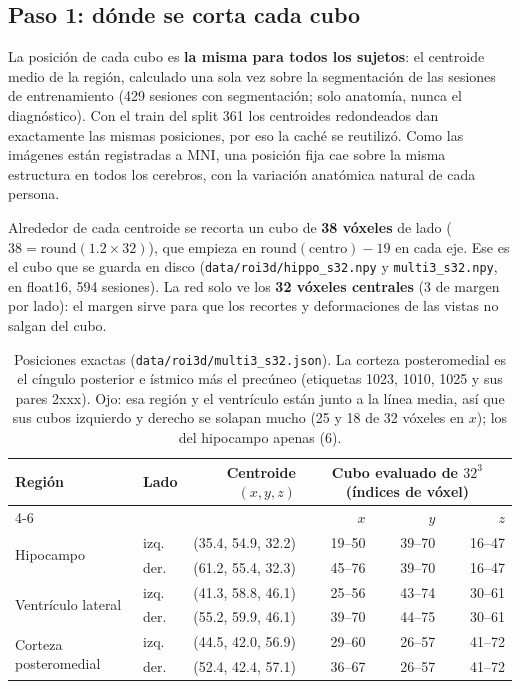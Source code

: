 \documentclass[11pt,a4paper]{article}
\begin{document}
\subsection{Paso 1: dónde se corta cada cubo}

La posición de cada cubo es \textbf{la misma para todos los sujetos}: el centroide medio de la
región, calculado una sola vez sobre la segmentación de las sesiones de entrenamiento (429 sesiones
con segmentación; solo anatomía, nunca el diagnóstico). Con el train del split 361 los centroides
redondeados dan exactamente las mismas posiciones, por eso la caché se reutilizó. Como las imágenes
están registradas a MNI, una posición fija cae sobre la misma estructura en todos los cerebros, con
la variación anatómica natural de cada persona.

Alrededor de cada centroide se recorta un cubo de \textbf{38 vóxeles} de lado
($38 = \mathrm{round}(1.2\times32)$), que empieza en $\mathrm{round}(\text{centro}) - 19$ en cada
eje. Ese es el cubo que se guarda en disco (\texttt{data/roi3d/hippo\_s32.npy} y
\texttt{multi3\_s32.npy}, en float16, 594 sesiones). La red solo ve los \textbf{32 vóxeles
centrales} (3 de margen por lado): el margen sirve para que los recortes y deformaciones de las
vistas no salgan del cubo.

\begin{table}[H]
\centering
\small
\begin{tabular}{llrrrr}
\toprule
Región & Lado & Centroide $(x,y,z)$ & \multicolumn{3}{c}{Cubo evaluado de $32^3$ (índices de vóxel)} \\
\cmidrule(lr){4-6}
 & & & $x$ & $y$ & $z$ \\
\midrule
\multirow{2}{*}{Hipocampo} & izq. & (35.4, 54.9, 32.2) & 19--50 & 39--70 & 16--47 \\
 & der. & (61.2, 55.4, 32.3) & 45--76 & 39--70 & 16--47 \\
\multirow{2}{*}{Ventrículo lateral} & izq. & (41.3, 58.8, 46.1) & 25--56 & 43--74 & 30--61 \\
 & der. & (55.2, 59.9, 46.1) & 39--70 & 44--75 & 30--61 \\
\multirow{2}{*}{Corteza posteromedial} & izq. & (44.5, 42.0, 56.9) & 29--60 & 26--57 & 41--72 \\
 & der. & (52.4, 42.4, 57.1) & 36--67 & 26--57 & 41--72 \\
\bottomrule
\end{tabular}
\caption{Posiciones exactas (\texttt{data/roi3d/multi3\_s32.json}). La corteza posteromedial es el
cíngulo posterior e ístmico más el precúneo (etiquetas 1023, 1010, 1025 y sus pares 2xxx). Ojo:
esa región y el ventrículo están junto a la línea media, así que sus cubos izquierdo y derecho se
solapan mucho (25 y 18 de 32 vóxeles en $x$); los del hipocampo apenas (6).}
\label{tab:positions}
\end{table}
\end{document}
